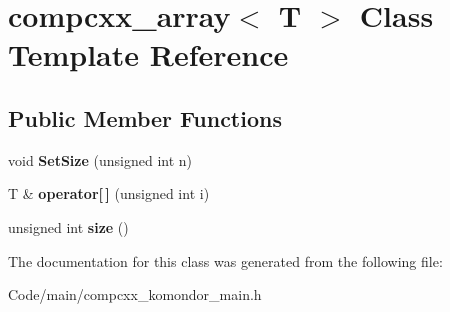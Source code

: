 \hypertarget{classcompcxx__array}{}\section{compcxx\+\_\+array$<$ T $>$ Class Template Reference}
\label{classcompcxx__array}
\subsection*{Public Member Functions}
\begin{DoxyCompactItemize}
\item 
\mbox{\label{classcompcxx__array_a873f82aa570a68fd38046f8f8dfc7f99}} 
void {\bfseries Set\+Size} (unsigned int n)
\item 
\mbox{\label{classcompcxx__array_a26b1d1297b95f557aeca69f390afa521}} 
T \& {\bfseries operator\mbox{[}$\,$\mbox{]}} (unsigned int i)
\item 
\mbox{\label{classcompcxx__array_a05fdecc7552fdb939f217fcc46e50cf4}} 
unsigned int {\bfseries size} ()
\end{DoxyCompactItemize}


The documentation for this class was generated from the following file\+:\begin{DoxyCompactItemize}
\item 
Code/main/compcxx\+\_\+komondor\+\_\+main.\+h\end{DoxyCompactItemize}
